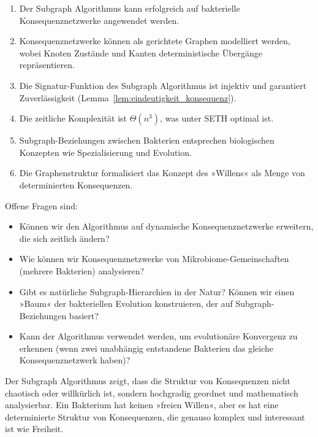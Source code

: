 \documentclass[a4paper,12pt]{article}
\theoremstyle{definition}
\begin{document}
\begin{enumerate}
    \item Der Subgraph Algorithmus kann erfolgreich auf bakterielle Konsequenznetzwerke angewendet werden.
    
    \item Konsequenznetzwerke können als gerichtete Graphen modelliert werden, wobei Knoten Zustände und Kanten deterministische Übergänge repräsentieren.
    
    \item Die Signatur-Funktion des Subgraph Algorithmus ist injektiv und garantiert Zuverlässigkeit (Lemma~\ref{lem:eindeutigkeit_konsequenz}).
    
    \item Die zeitliche Komplexität ist $\Theta(n^3)$, was unter SETH optimal ist.
    
    \item Subgraph-Beziehungen zwischen Bakterien entsprechen biologischen Konzepten wie Spezialisierung und Evolution.
    
    \item Die Graphenstruktur formalisiert das Konzept des »Willens« als Menge von determinierten Konsequenzen.
\end{enumerate}

Offene Fragen sind:

\begin{itemize}
    \item Können wir den Algorithmus auf dynamische Konsequenznetzwerke erweitern, die sich zeitlich ändern?
    
    \item Wie können wir Konsequenznetzwerke von Mikrobiome-Gemeinschaften (mehrere Bakterien) analysieren?
    
    \item Gibt es natürliche Subgraph-Hierarchien in der Natur? Können wir einen »Baum« der bakteriellen Evolution konstruieren, der auf Subgraph-Beziehungen basiert?
    
    \item Kann der Algorithmus verwendet werden, um evolutionäre Konvergenz zu erkennen (wenn zwei unabhängig entstandene Bakterien das gleiche Konsequenznetzwerk haben)?
\end{itemize}

Der Subgraph Algorithmus zeigt, dass die Struktur von Konsequenzen nicht chaotisch oder willkürlich ist, sondern hochgradig geordnet und mathematisch analysierbar. Ein Bakterium hat keinen »freien Willen«, aber es hat eine determinierte Struktur von Konsequenzen, die genauso komplex und interessant ist wie Freiheit. 
\end{document}

